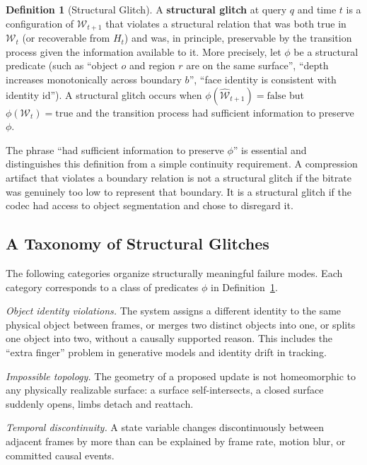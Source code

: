 \documentclass[12pt,a4paper]{article}
\theoremstyle{plain}
\theoremstyle{definition}
\newtheorem{definition}[theorem]{Definition}
\theoremstyle{remark}
\begin{document}
\begin{definition}[Structural Glitch]
\label{def:glitch}
A \textbf{structural glitch} at query $q$ and time $t$ is a configuration of $\hat{\mathcal{W}}_{t+1}$ that violates a structural relation that was both true in $\mathcal{W}_t$ (or recoverable from $H_t$) and was, in principle, preservable by the transition process given the information available to it. More precisely, let $\phi$ be a structural predicate (such as ``object $o$ and region $r$ are on the same surface'', ``depth increases monotonically across boundary $b$'', ``face identity is consistent with identity $\text{id}$''). A structural glitch occurs when $\phi(\hat{\mathcal{W}}_{t+1}) = \text{false}$ but $\phi(\mathcal{W}_t) = \text{true}$ and the transition process had sufficient information to preserve $\phi$.
\end{definition}

The phrase ``had sufficient information to preserve $\phi$'' is essential and distinguishes this definition from a simple continuity requirement. A compression artifact that violates a boundary relation is not a structural glitch if the bitrate was genuinely too low to represent that boundary. It is a structural glitch if the codec had access to object segmentation and chose to disregard it.

\subsection{A Taxonomy of Structural Glitches}

The following categories organize structurally meaningful failure modes. Each category corresponds to a class of predicates $\phi$ in Definition~\ref{def:glitch}.

\textit{Object identity violations.} The system assigns a different identity to the same physical object between frames, or merges two distinct objects into one, or splits one object into two, without a causally supported reason. This includes the ``extra finger'' problem in generative models and identity drift in tracking.

\textit{Impossible topology.} The geometry of a proposed update is not homeomorphic to any physically realizable surface: a surface self-intersects, a closed surface suddenly opens, limbs detach and reattach.

\textit{Temporal discontinuity.} A state variable changes discontinuously between adjacent frames by more than can be explained by frame rate, motion blur, or committed causal events.
\end{document}
